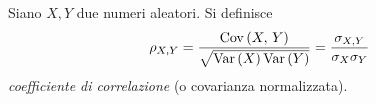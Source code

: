 \documentclass{subfiles}
\begin{document}
Siano \(X, Y\) due numeri aleatori. Si definisce
\[
    \rho_{X,Y} = \Frac{\Cov{X}{Y}}{\sqrt{\Var{X}\Var{Y}}} = \Frac{\sigma_{X,Y}}{\sigma_{X}\sigma_{Y}}
\]
\emph{coefficiente di correlazione} (o covarianza normalizzata).
\end{document}
